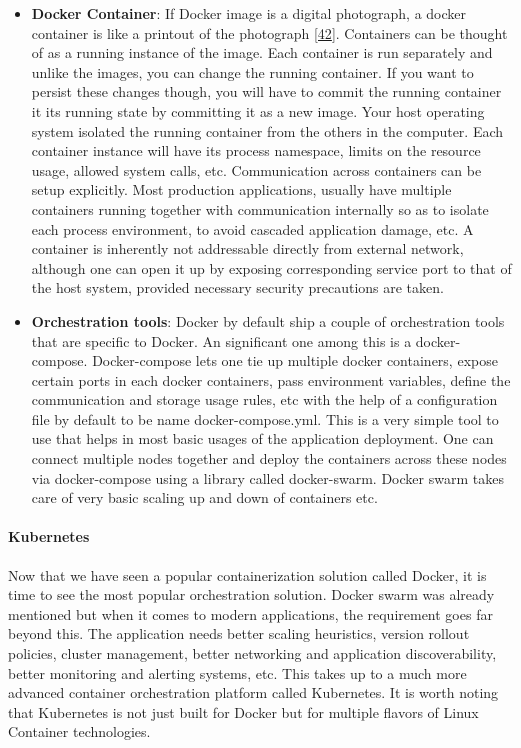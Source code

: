 \documentclass[12pt,titlepage]{article}
\begin{document}
\begin{itemize}
\item \textbf{Docker Container}: If Docker image is a digital photograph, a docker container is like a printout
of the photograph \hyperref[ref:42]{[42}]. Containers can be thought of as a running instance
of the image. Each container is run separately and unlike the images, you can
change the running container. If you want to persist these changes though, you
will have to commit the running container it its running state by committing it
as a new image. Your host operating system isolated the running container from
the others in the computer. Each container instance will have its process
namespace, limits on the resource usage, allowed system calls, etc.
Communication across containers can be setup explicitly. Most production
applications, usually have multiple containers running together with
communication internally so as to isolate each process environment, to avoid
cascaded application damage, etc. A container is inherently not addressable
directly from external network, although one can open it up by exposing
corresponding service port to that of the host system, provided necessary
security precautions are taken.

\item \textbf{Orchestration tools}: Docker by default ship a couple of orchestration tools that are specific to
Docker. An significant one among this is a docker-compose. Docker-compose lets
one tie up multiple docker containers, expose certain ports in each docker
containers, pass environment variables, define the communication and storage
usage rules, etc with the help of a configuration file by default to be name
docker-compose.yml. This is a very simple tool to use that helps in most basic
usages of the application deployment. One can connect multiple nodes together
and deploy the containers across these nodes via docker-compose using a library
called docker-swarm. Docker swarm takes care of very basic scaling up and down
of containers etc.
\end{itemize}

\paragraph{Kubernetes}
\label{sec:org4ddf654}
Now that we have seen a popular containerization solution called Docker, it is
time to see the most popular orchestration solution. Docker swarm was already
mentioned but when it comes to modern applications, the requirement goes far
beyond this. The application needs better scaling heuristics, version rollout
policies, cluster management, better networking and application discoverability,
better monitoring and alerting systems, etc. This takes up to a much more
advanced container orchestration platform called Kubernetes. It is worth noting
that Kubernetes is not just built for Docker but for multiple flavors of Linux
Container technologies.
\end{document}
